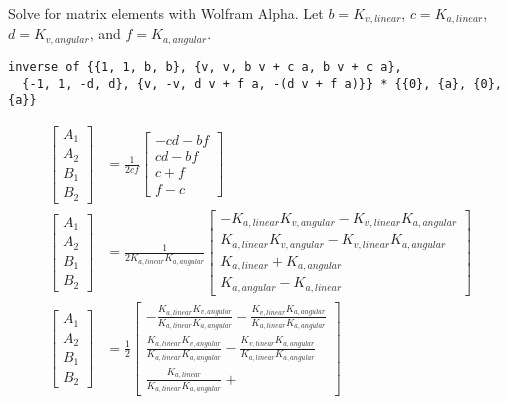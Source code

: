 Solve for matrix elements with Wolfram Alpha. Let
$b = K_{v,linear}$, $c = K_{a,linear}$, $d = K_{v,angular}$, and $f = K_{a,angular}$.
\begin{verbatim}
inverse of {{1, 1, b, b}, {v, v, b v + c a, b v + c a},
  {-1, 1, -d, d}, {v, -v, d v + f a, -(d v + f a)}} * {{0}, {a}, {0}, {a}}
\end{verbatim}
\begin{align*}
  \begin{bmatrix}
    A_1 \\
    A_2 \\
    B_1 \\
    B_2
  \end{bmatrix} &= \frac{1}{2cf}
  \begin{bmatrix}
    -cd - bf \\
    cd - bf \\
    c + f \\
    f - c
  \end{bmatrix} \\
  \begin{bmatrix}
    A_1 \\
    A_2 \\
    B_1 \\
    B_2
  \end{bmatrix} &= \frac{1}{2 K_{a,linear} K_{a,angular}}
  \begin{bmatrix}
    -K_{a,linear} K_{v,angular} - K_{v,linear} K_{a,angular} \\
    K_{a,linear} K_{v,angular} - K_{v,linear} K_{a,angular} \\
    K_{a,linear} + K_{a,angular} \\
    K_{a,angular} - K_{a,linear}
  \end{bmatrix} \\
  \begin{bmatrix}
    A_1 \\
    A_2 \\
    B_1 \\
    B_2
  \end{bmatrix} &= \frac{1}{2}
  \begin{bmatrix}
    -\frac{K_{a,linear} K_{v,angular}}{K_{a,linear} K_{a,angular}} -
      \frac{K_{v,linear} K_{a,angular}}{K_{a,linear} K_{a,angular}} \\
    \frac{K_{a,linear} K_{v,angular}}{K_{a,linear} K_{a,angular}} -
      \frac{K_{v,linear} K_{a,angular}}{K_{a,linear} K_{a,angular}} \\
    \frac{K_{a,linear}}{K_{a,linear} K_{a,angular}} +

\end{bmatrix}
\end{align*}
